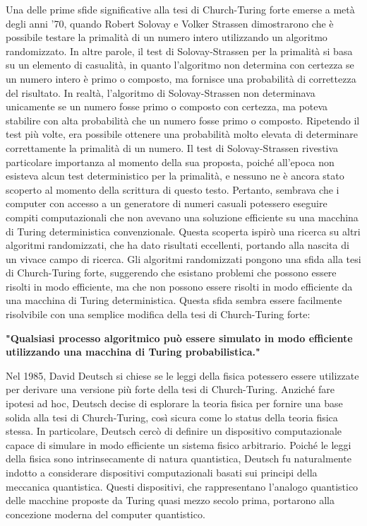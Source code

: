 \documentclass[a4paper,12pt]{report}
\theoremstyle{plain}
\begin{document}
Una delle prime sfide significative alla tesi di Church-Turing forte emerse a metà degli anni '70, quando Robert Solovay e Volker Strassen dimostrarono che è possibile testare la primalità di un numero intero utilizzando un algoritmo randomizzato. 
In altre parole, il test di Solovay-Strassen per la primalità si basa su un elemento di casualità, in quanto l'algoritmo non determina con certezza se un numero intero è primo o composto, ma fornisce una probabilità di correttezza del risultato. In realtà, l'algoritmo di Solovay-Strassen non determinava unicamente se un numero fosse primo o composto con certezza, ma poteva stabilire con alta probabilità che un numero fosse primo o composto. Ripetendo il test più volte, era possibile ottenere una probabilità molto elevata di determinare correttamente la primalità di un numero. 
Il test di Solovay-Strassen rivestiva particolare importanza al momento della sua proposta, poiché all'epoca non esisteva alcun test deterministico per la primalità, e nessuno ne è ancora stato scoperto al momento della scrittura di questo testo. Pertanto, sembrava che i computer con accesso a un generatore di numeri casuali potessero eseguire compiti computazionali che non avevano una soluzione efficiente su una macchina di Turing deterministica convenzionale. Questa scoperta ispirò una ricerca su altri algoritmi randomizzati, che ha dato risultati eccellenti, portando alla nascita di un vivace campo di ricerca. 
Gli algoritmi randomizzati pongono una sfida alla tesi di Church-Turing forte, suggerendo che esistano problemi che possono essere risolti in modo efficiente, ma che non possono essere risolti in modo efficiente da una macchina di Turing deterministica. Questa sfida sembra essere facilmente risolvibile con una semplice modifica della tesi di Church-Turing forte:
\begin{center}
    \textbf{"Qualsiasi processo algoritmico può essere simulato in modo efficiente utilizzando una macchina di Turing probabilistica."}
\end{center}
Nel 1985, David Deutsch si chiese se le leggi della fisica potessero essere utilizzate per derivare una versione più forte della tesi di Church-Turing. Anziché fare ipotesi ad hoc, Deutsch decise di esplorare la teoria fisica per fornire una base solida alla tesi di Church-Turing, così sicura come lo status della teoria fisica stessa. In particolare, Deutsch cercò di definire un dispositivo computazionale capace di simulare in modo efficiente un sistema fisico arbitrario. 
Poiché le leggi della fisica sono intrinsecamente di natura quantistica, Deutsch fu naturalmente indotto a considerare dispositivi computazionali basati sui principi della meccanica quantistica. Questi dispositivi, che rappresentano l'analogo quantistico delle macchine proposte da Turing quasi mezzo secolo prima, portarono alla concezione moderna del computer quantistico. 
\end{document}
